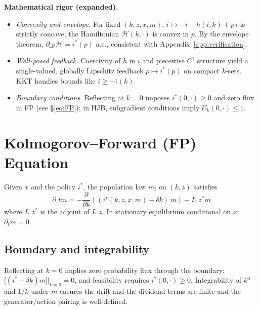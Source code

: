 ﻿\documentclass[11pt,letterpaper,oneside]{article}
\numberwithin{equation}{section}
\newcommand{\1}{\mathbf{1}}
\newcommand{\Lz}{L\_z}
\newcommand{\Lzadj}{L\_z^{\!*}}
\newcommand{\kbar}{\bar\iota}
\begin{document}
\begin{tcolorbox}[mathstyle]
\textbf{Mathematical rigor (expanded).}
\begin{itemize}[leftmargin=1.15em,itemsep=0.25em]
  \item \emph{Convexity and envelope.} For fixed $(k,z,x,m)$, $i\mapsto -i-h(i,k)+p\,i$ is strictly concave; the Hamiltonian $\mathcal H(k,\cdot)$ is convex in $p$. By the envelope theorem, $\partial\_p\mathcal H=i^*(p)$ a.e., consistent with Appendix~\ref{app:verification}.
  \item \emph{Well-posed feedback.} Coercivity of $h$ in $i$ and piecewise $C^1$ structure yield a single-valued, globally Lipschitz feedback $p\mapsto i^*(p)$ on compact $k$-sets. KKT handles bounds like $i\ge-\kbar(k)$.
  \item \emph{Boundary conditions.} Reflecting at $k=0$ imposes $i^*(0,\cdot)\ge0$ and zero flux in FP (see \S\ref{eq:FP}); in HJB, subgradient conditions imply $U_k(0,\cdot)\le1$.
\end{itemize}
\end{tcolorbox}

\section{Kolmogorov--Forward (FP) Equation}

Given $x$ and the policy $i^*$, the population law $m_t$ on $(k,z)$ satisfies
\begin{equation}
\partial\_t m = -\frac{\partial}{\partial k}\left((i^\star(k,z,x,m)-\delta k)\, m\right) + \Lzadj m
\tag{FP}\label{eq:FP}
\end{equation}
where $\Lzadj$ is the adjoint of $\Lz$. In stationary equilibrium conditional on $x$: $\partial_t m=0$.

\subsection{Boundary and integrability}
Reflecting at $k=0$ implies zero probability flux through the boundary:
$\big[(i^*-\delta k)m\big]\big|_{k=0}=0$,
and feasibility requires $i^*(0,\cdot)\ge 0$. Integrability of $k^\alpha$ and $1/k$ under $m$ ensures the drift and the dividend terms are finite and the generator/action pairing is well-defined.
\end{document}
